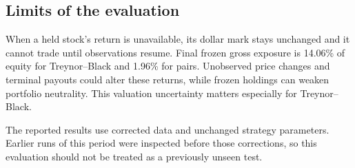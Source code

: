 \subsection{Limits of the evaluation}

When a held stock's return is unavailable, its dollar mark stays unchanged
and it cannot trade until observations resume. Final frozen gross exposure
is 14.06\% of equity for Treynor--Black and 1.96\% for pairs.
Unobserved price changes and terminal payouts could alter these returns,
while frozen holdings can weaken portfolio neutrality. This valuation
uncertainty matters especially for Treynor--Black.

The reported results use corrected data and unchanged strategy parameters.
Earlier runs of this period were inspected before those corrections, so
this evaluation should not be treated as a previously unseen test.

